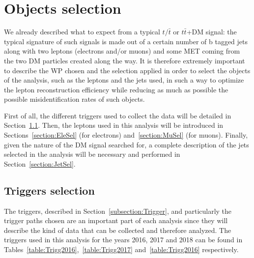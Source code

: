 \documentclass[a4paper, 10pt, openright]{report}
\begin{document}
\section{Objects selection} \label{section:Selection}

We already described what to expect from a typical $t/\bar t$ or $t \bar t$+DM signal: the typical signature of such signals is made out of a certain number of b tagged jets along with two leptons (electrons and/or muons) and some \ac{MET} coming from the two \ac{DM} particles created along the way. It is therefore extremely important to describe the \ac{WP} chosen and the selection applied in order to select the objects of the analysis, such as the leptons and the jets used, in such a way to optimize the lepton reconstruction efficiency while reducing as much as possible the possible misidentification rates of such objects.

First of all, the different triggers used to collect the data will be detailed in Section~\ref{section:Triggers}. Then, the leptons used in this analysis will be introduced in Sections~\ref{section:EleSel} (for electrons) and~\ref{section:MuSel} (for muons). Finally, given the nature of the \ac{DM} signal searched for, a complete description of the jets selected in the analysis will be necessary and performed in Section~\ref{section:JetSel}.

\subsection{Triggers selection} \label{section:Triggers}

The triggers, described in Section~\ref{subsection:Trigger}, and particularly the trigger paths chosen are an important part of each analysis since they will describe the kind of data that can be collected and therefore analyzed. The triggers used in this analysis for the years 2016, 2017 and 2018 can be found in Tables~\ref{table:Trigg2016},~\ref{table:Trigg2017} and~\ref{table:Trigg2016} respectively.
\end{document}

